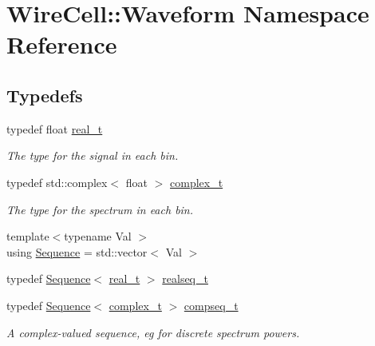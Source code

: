 \hypertarget{namespace_wire_cell_1_1_waveform}{}\section{Wire\+Cell\+:\+:Waveform Namespace Reference}
\label{namespace_wire_cell_1_1_waveform}
\subsection*{Typedefs}
\begin{DoxyCompactItemize}
\item 
typedef float \hyperlink{namespace_wire_cell_1_1_waveform_a47570354e4599d8387803188186aba1f}{real\+\_\+t}
\begin{DoxyCompactList}\small\item\em The type for the signal in each bin. \end{DoxyCompactList}\item 
typedef std\+::complex$<$ float $>$ \hyperlink{namespace_wire_cell_1_1_waveform_a4a69305e16ea32b03030a13a52478c38}{complex\+\_\+t}
\begin{DoxyCompactList}\small\item\em The type for the spectrum in each bin. \end{DoxyCompactList}\item 
{\footnotesize template$<$typename Val $>$ }\\using \hyperlink{namespace_wire_cell_1_1_waveform_a1d2a1b672e3b220dcd64a994531de95d}{Sequence} = std\+::vector$<$ Val $>$
\item 
typedef \hyperlink{namespace_wire_cell_1_1_waveform_a1d2a1b672e3b220dcd64a994531de95d}{Sequence}$<$ \hyperlink{namespace_wire_cell_1_1_waveform_a47570354e4599d8387803188186aba1f}{real\+\_\+t} $>$ \hyperlink{namespace_wire_cell_1_1_waveform_a479175e541c8545e87cd8063b74b6956}{realseq\+\_\+t}
\item 
typedef \hyperlink{namespace_wire_cell_1_1_waveform_a1d2a1b672e3b220dcd64a994531de95d}{Sequence}$<$ \hyperlink{namespace_wire_cell_1_1_waveform_a4a69305e16ea32b03030a13a52478c38}{complex\+\_\+t} $>$ \hyperlink{namespace_wire_cell_1_1_waveform_a7e4a8d371f774438bb360e7d1dcb583a}{compseq\+\_\+t}
\begin{DoxyCompactList}\small\item\em A complex-\/valued sequence, eg for discrete spectrum powers. \end{DoxyCompactList}\item 

\end{DoxyCompactItemize}
